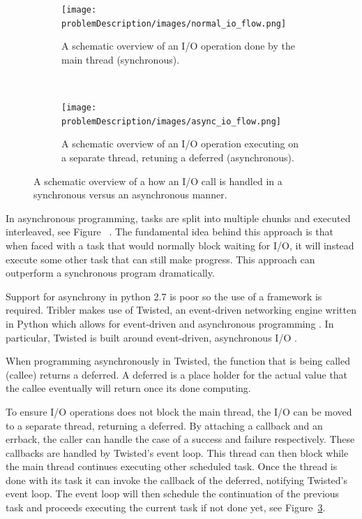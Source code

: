 \begin{figure}[t]
	\centering
	\begin{subfigure}[b]{\textwidth}
		\texttt{[image: problemDescription/images/normal\_io\_flow.png]}
		\caption{A schematic overview of an I/O operation done by the main thread (synchronous).}
		\label{fig:normal_io_flow}
	\end{subfigure}
	~ %
	\begin{subfigure}[b]{\textwidth}
		\texttt{[image: problemDescription/images/async\_io\_flow.png]}
		\caption{A schematic overview of an I/O operation executing on a separate thread, retuning a deferred (asynchronous).}
		\label{fig:async_io_flow}
	\end{subfigure}
	\caption{A schematic overview of a how an I/O call is handled in a synchronous versus an asynchronous manner.}
\end{figure}

In asynchronous programming, tasks are split into multiple chunks and executed interleaved, see Figure~ .
The fundamental idea behind this approach is that when faced with a task that would normally block waiting for I/O, it will instead execute some other task that can still make progress.
This approach can outperform a synchronous program dramatically.

Support for asynchrony in python 2.7 is poor so the use of a framework is required.
Tribler makes use of Twisted, an event-driven networking engine written in Python which allows for event-driven and asynchronous programming \cite{kinder2005event}.
In particular, Twisted is built around event-driven, asynchronous I/O \cite{lefkowitz2003network}.

When programming asynchronously in Twisted, the function that is being called (callee) returns a deferred.
A deferred is a place holder for the actual value that the callee eventually will return once its done computing.

To ensure I/O operations does not block the main thread, the I/O can be moved to a separate thread, returning a deferred.
By attaching a callback and an errback, the caller can handle the case of a success and failure respectively.
These callbacks are handled by Twisted's event loop.
This thread can then block while the main thread continues executing other scheduled task.
Once the thread is done with its task it can invoke the callback of the deferred, notifying Twisted's event loop.
The event loop will then schedule the continuation of the previous task and proceeds executing the current task if not done yet, see Figure~\ref{fig:async_io_flow}.


